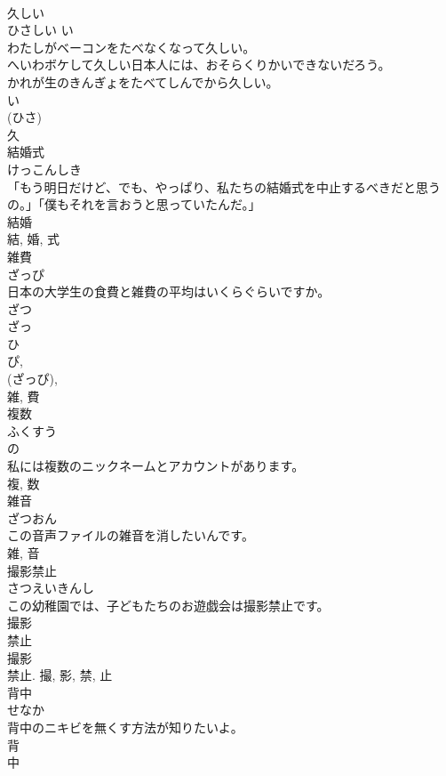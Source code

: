 \documentclass[8pt]{extreport}
\begin{document}
\begin{CJK}{UTF8}{min}
\\	久しい	
\\	ひさしい	い 
\\	わたしがベーコンをたべなくなって久しい。	
\\	へいわボケして久しい日本人には、おそらくりかいできないだろう。	
\\	かれが生のきんぎょをたべてしんでから久しい。	
\\	い 
\\	(ひさ) 
\\	久	
\\	結婚式	
\\	けっこんしき	
\\	「もう明日だけど、でも、やっぱり、私たちの結婚式を中止するべきだと思うの。」「僕もそれを言おうと思っていたんだ。」	
\\	結婚 
\\	結, 婚, 式	
\\	雑費	
\\	ざっぴ	
\\	日本の大学生の食費と雑費の平均はいくらぐらいですか。	
\\	ざつ 
\\	ざっ 
\\	ひ 
\\	ぴ, 
\\	(ざっぴ), 
\\	雑, 費	
\\	複数	
\\	ふくすう	
\\	の 
\\	私には複数のニックネームとアカウントがあります。	
\\	複, 数	
\\	雑音	
\\	ざつおん	
\\	この音声ファイルの雑音を消したいんです。	
\\	雑, 音	
\\	撮影禁止	
\\	さつえいきんし	
\\	この幼稚園では、子どもたちのお遊戯会は撮影禁止です。	
\\	撮影 
\\	禁止 
\\	撮影 
\\	禁止.	撮, 影, 禁, 止	
\\	背中	
\\	せなか	
\\	背中のニキビを無くす方法が知りたいよ。	
\\	背 
\\	中 

\end{CJK}
\end{document}
